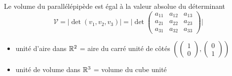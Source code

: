 \begin{frame}

\begin{minipage}{0.68\textwidth}
\begin{proposition}
Le volume du parallélépipède est égal à la valeur absolue du déterminant
\[
\mathcal{V} = \Big|\det(v_1,v_2,v_3)\Big|
 = \Big| \det \begin{pmatrix}
a_{11}&a_{12}&a_{13}\\
a_{21}&a_{22}&a_{23}\\
a_{31}&a_{32}&a_{33}
\end{pmatrix}
\Big|
\]
\end{proposition}  
\end{minipage}\hspace*{0.5em}
\begin{minipage}{0.29\textwidth}
\end{minipage}


\bigskip

\begin{itemize}
  \item\pause unité d'aire dans $\mathbb{R}^2$ = aire du carré unité de côtés $\left(\left(\begin{smallmatrix} 1 \\ 0 \end{smallmatrix} \right),
\left(\begin{smallmatrix} 0 \\ 1 \end{smallmatrix} \right)\right)$
  \item\pause unité de volume dans $\mathbb{R}^3$ = volume du cube unité
\end{itemize}

\end{frame}



